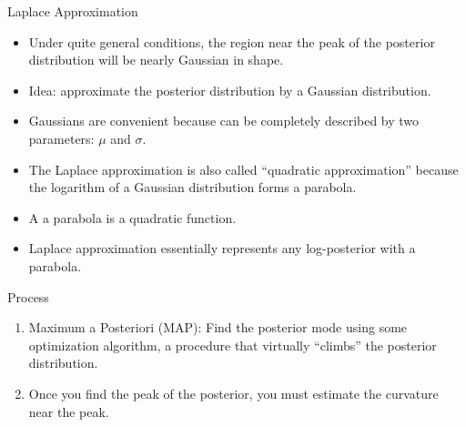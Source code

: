 \documentclass[handout]{beamer}
\begin{document}
\begin{frame}{Laplace Approximation}
\scriptsize{

\begin{itemize}
\item Under quite general conditions, the region near the peak of the posterior distribution will be nearly Gaussian in shape.
\item Idea: approximate the posterior distribution by a Gaussian distribution.
\item Gaussians are convenient because can be completely described by two parameters: $\mu$ and $\sigma$. 
\item The Laplace approximation is also called ``quadratic approximation'' because the logarithm of
a Gaussian distribution forms a parabola. 
\item A a parabola is a quadratic function.
\item Laplace approximation essentially represents any log-posterior with a parabola.
\end{itemize}


\begin{block}{Process}
\begin{enumerate}
  \item Maximum a Posteriori (MAP): Find the posterior mode using some optimization algorithm, a procedure that virtually “climbs” the posterior distribution.
  \item Once you find the peak of the posterior, you must estimate the curvature near the
peak.
\end{enumerate}
\end{block}


} 

\end{frame}
\end{document}
